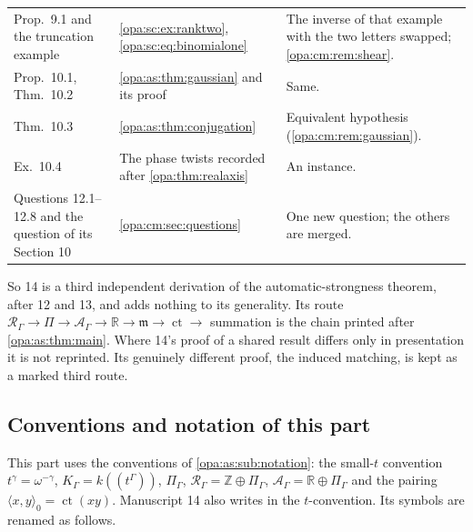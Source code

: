 \documentclass[11pt,oneside]{article}
\numberwithin{equation}{section}
\theoremstyle{definition}
\theoremstyle{remark}
\newcommand{\R}{\mathbb R}
\newcommand{\Z}{\mathbb Z}
\newcommand{\mm}{\mathfrak m}
\newcommand{\ct}{\operatorname{ct}}
\newcommand{\Hahn}[2]{#1((t^{#2}))}
\newcommand{\pairing}[2]{\langle #1,#2\rangle_0}
\begin{document}
\begin{center}
\begin{longtable}{>{\raggedright\arraybackslash}p{}>{\raggedright\arraybackslash}p{}>{\raggedright\arraybackslash}p{}}
Prop.~9.1 and the truncation example & \cref{opa:sc:ex:ranktwo}, \eqref{opa:sc:eq:binomialone} &
The inverse of that example with the two letters swapped; \cref{opa:cm:rem:shear}.\\
Prop.~10.1, Thm.~10.2 & \cref{opa:as:thm:gaussian} and its proof & Same.\\
Thm.~10.3 & \cref{opa:as:thm:conjugation} & Equivalent hypothesis (\cref{opa:cm:rem:gaussian}).\\
Ex.~10.4 & The phase twists recorded after \cref{opa:thm:realaxis} & An instance.\\
Questions 12.1--12.8 and the question of its Section 10 & \cref{opa:cm:sec:questions} & One
new question; the others are merged.\\
\bottomrule
\end{longtable}
\end{center}

So 14 is a third independent derivation of the automatic-strongness theorem, after 12 and
13, and adds nothing to its generality. Its route
$\mathcal R_\Gamma\to\Pi\to\mathcal A_\Gamma\to\R\to\mm\to\ct\to$ summation is the chain
printed after \cref{opa:as:thm:main}. Where 14's proof of a shared result differs only in
presentation it is not reprinted. Its genuinely different proof, the induced matching, is
kept as a marked third route.

\subsection{Conventions and notation of this part}\label{opa:cm:sub:notation}

This part uses the conventions of \cref{opa:as:sub:notation}: the small-$t$ convention
$t^\gamma=\omega^{-\gamma}$, $K_\Gamma=\Hahn k\Gamma$, $\Pi_\Gamma$, $\mathcal R_\Gamma=\Z\oplus\Pi_\Gamma$,
$\mathcal A_\Gamma=\R\oplus\Pi_\Gamma$ and the pairing $\pairing xy=\ct(xy)$. Manuscript 14 also
writes in the $t$-convention. Its symbols are renamed as follows.
\end{document}
